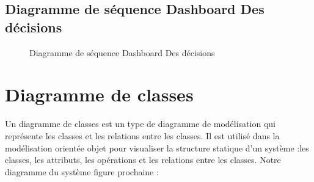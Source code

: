 \break
\subsection{Diagramme de séquence Dashboard Des décisions }
\begin{figure}[hbt]
\centering
\right
\label{fig: DS Dashboard Des décisions }
  \caption{Diagramme de séquence Dashboard Des décisions }
\end{figure}

\newpage
\section{Diagramme de classes}
Un diagramme de classes est un type de diagramme de modélisation qui représente les classes et les relations entre les classes. Il est utilisé dans la modélisation orientée objet pour visualiser la structure statique d'un système :les classes, les attributs, les opérations et les relations entre les classes. Notre diagramme du système  figure prochaine :



